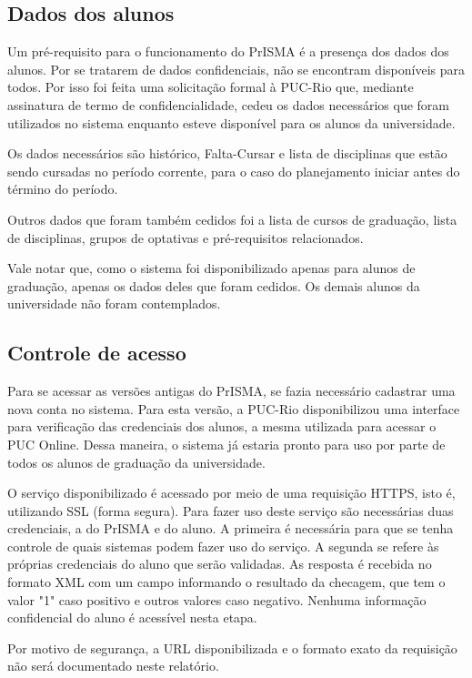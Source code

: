 \documentclass[graduacao,brazil]{ThesisPUC}
\begin{document}
\subsection{Dados dos alunos}

Um pré-requisito para o funcionamento do PrISMA é a presença dos dados dos alunos. Por se tratarem de dados confidenciais, não se encontram disponíveis para todos. Por isso foi feita uma solicitação formal à PUC-Rio que, mediante assinatura de termo de confidencialidade, cedeu os dados necessários que foram utilizados no sistema enquanto esteve disponível para os alunos da universidade. 

Os dados necessários são histórico, Falta-Cursar e lista de disciplinas que estão sendo cursadas no período corrente, para o caso do planejamento iniciar antes do término do período. 

Outros dados que foram também cedidos foi a lista de cursos de graduação, lista de disciplinas, grupos de optativas e pré-requisitos relacionados. 

Vale notar que, como o sistema foi disponibilizado apenas para alunos de graduação, apenas os dados deles que foram cedidos. Os demais alunos da universidade não foram contemplados.

\subsection{Controle de acesso}

Para se acessar as versões antigas do PrISMA, se fazia necessário cadastrar uma nova conta no sistema. Para esta versão, a PUC-Rio disponibilizou uma interface para verificação das credenciais dos alunos, a mesma utilizada para acessar o PUC Online. Dessa maneira, o sistema já estaria pronto para uso por parte de todos os alunos de graduação da universidade. 

O serviço disponibilizado é acessado por meio de uma requisição HTTPS, isto é, utilizando SSL (forma segura). Para fazer uso deste serviço são necessárias duas credenciais, a do PrISMA e do aluno. A primeira é necessária para que se tenha controle de quais sistemas podem fazer uso do serviço. A segunda se refere às próprias credenciais do aluno que serão validadas. As resposta é recebida no formato XML com um campo informando o resultado da checagem, que tem o valor "1" caso positivo e outros valores caso negativo. Nenhuma informação confidencial do aluno é acessível nesta etapa. 

Por motivo de segurança, a URL disponibilizada e o formato exato da requisição não será documentado neste relatório.
\end{document}
